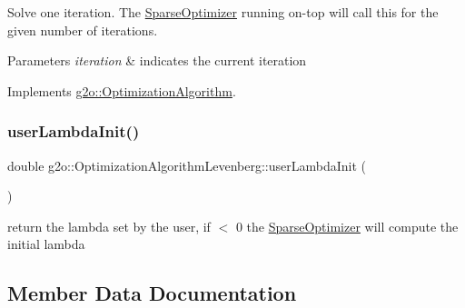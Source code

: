 Solve one iteration. The \mbox{\hyperlink{classg2o_1_1_sparse_optimizer}{Sparse\+Optimizer}} running on-\/top will call this for the given number of iterations. 
\begin{DoxyParams}{Parameters}
{\em iteration} & indicates the current iteration \\
\hline
\end{DoxyParams}


Implements \mbox{\hyperlink{classg2o_1_1_optimization_algorithm_ab174deeeb2551ceaf715ea09f0f9c077}{g2o\+::\+Optimization\+Algorithm}}.

\mbox{\label{classg2o_1_1_optimization_algorithm_levenberg_a4a4d18c98361a1288db724136d353596}} 
\subsubsection{\texorpdfstring{user\+Lambda\+Init()}{userLambdaInit()}}
{\footnotesize\ttfamily double g2o\+::\+Optimization\+Algorithm\+Levenberg\+::user\+Lambda\+Init (\begin{DoxyParamCaption}{ }\end{DoxyParamCaption})\hspace{0.3cm}{\ttfamily [inline]}}



return the lambda set by the user, if $<$ 0 the \mbox{\hyperlink{classg2o_1_1_sparse_optimizer}{Sparse\+Optimizer}} will compute the initial lambda 



\subsection{Member Data Documentation}
\mbox{\label{classg2o_1_1_optimization_algorithm_levenberg_aec7bba815e20361aa7ccc4661f90a034}} 
